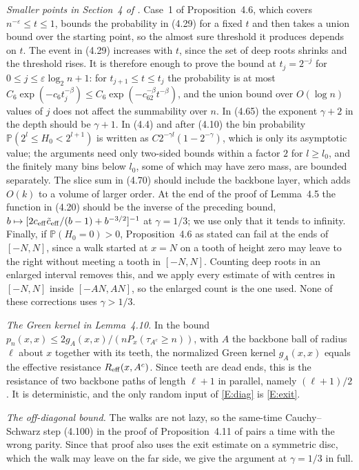 \documentclass[11pt]{amsart}
\theoremstyle{remark}
\numberwithin{equation}{section}
\newcommand{\PP}{\mathbb{P}}
\begin{document}
\emph{Smaller points in Section~4 of \cite{DNNS}.} Case~1 of Proposition~4.6, which covers $n^{-\varepsilon}\le t\le1$, bounds the probability in (4.29) for a fixed $t$ and then takes a union bound over the starting point, so the almost sure threshold it produces depends on $t$. The event in (4.29) increases with $t$, since the set of deep roots shrinks and the threshold rises. It is therefore enough to prove the bound at $t_j=2^{-j}$ for $0\le j\le\varepsilon\log_2n+1$: for $t_{j+1}\le t\le t_j$ the probability is at most $C_6\exp(-c_6t_j^{-\beta})\le C_6\exp(-c_62^{-\beta}t^{-\beta})$, and the union bound over $O(\log n)$ values of $j$ does not affect the summability over $n$. In (4.65) the exponent $\gamma+2$ in the depth should be $\gamma+1$. In (4.4) and after (4.10) the bin probability $\PP(2^l\le H_0<2^{l+1})$ is written as $C2^{-\gamma l}(1-2^{-\gamma})$, which is only its asymptotic value; the arguments need only two-sided bounds within a factor $2$ for $l\ge l_0$, and the finitely many bins below $l_0$, some of which may have zero mass, are bounded separately. The slice sum in (4.70) should include the backbone layer, which adds $O(k)$ to a volume of larger order. At the end of the proof of Lemma~4.5 the function in (4.20) should be the inverse of the preceding bound, $b\mapsto[2c_{\rm eff}\tilde c_{\rm eff}/(b-1)+b^{-3/2}]^{-1}$ at $\gamma=1/3$; we use only that it tends to infinity. Finally, if $\PP(H_0=0)>0$, Proposition~4.6 as stated can fail at the ends of $[-N,N]$, since a walk started at $x=N$ on a tooth of height zero may leave to the right without meeting a tooth in $[-N,N]$. Counting deep roots in an enlarged interval removes this, and we apply every estimate of \cite{DNNS} with centres in $[-N,N]$ inside $[-AN,AN]$, so the enlarged count is the one used. None of these corrections uses $\gamma>1/3$.

\emph{The Green kernel in Lemma~4.10.} In the bound $p_n(x,x)\le2g_A(x,x)/(nP_x(\tau_{A^c}\ge n))$, with $A$ the backbone ball of radius $\ell$ about $x$ together with its teeth, the normalized Green kernel $g_A(x,x)$ equals the effective resistance $R_{\rm eff}(x,A^c)$. Since teeth are dead ends, this is the resistance of two backbone paths of length $\ell+1$ in parallel, namely $(\ell+1)/2$. It is deterministic, and the only random input of \ref{E:diag} is \ref{E:exit}.

\emph{The off-diagonal bound.} The walks are not lazy, so the same-time Cauchy--Schwarz step (4.100) in the proof of Proposition~4.11 of \cite{DNNS} pairs a time with the wrong parity. Since that proof also uses the exit estimate on a symmetric disc, which the walk may leave on the far side, we give the argument at $\gamma=1/3$ in full.
\end{document}

